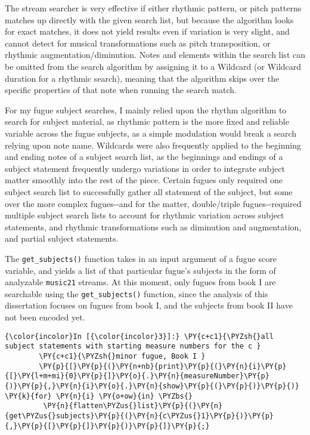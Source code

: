 The stream searcher is very effective if either rhythmic pattern, or
pitch patterns matches up directly with the given search list, but
because the algorithm looks for exact matches, it does not yield results
even if variation is very slight, and cannot detect for musical
transformations such as pitch transposition, or rhythmic
augmentation/diminution. Notes and elements within the search list can
be omitted from the search algorithm by assigning it to a Wildcard (or
Wildcard duration for a rhythmic search), meaning that the algorithm
skips over the specific properties of that note when running the search
match.

For my fugue subject searches, I mainly relied upon the rhythm algorithm
to search for subject material, as rhythmic pattern is the more fixed
and reliable variable across the fugue subjects, as a simple modulation
would break a search relying upon note name. Wildcards were also
frequently applied to the beginning and ending notes of a subject search
list, as the beginnings and endings of a subject statement frequently
undergo variations in order to integrate subject matter smoothly into
the rest of the piece. Certain fugues only required one subject search
list to successfully gather all statement of the subject, but some over
the more complex fugues-\/-and for the matter, double/triple
fugues-\/-required multiple subject search lists to account for rhythmic
variation across subject statements, and rhythmic transformations such
as diminution and augmentation, and partial subject statements.

The \texttt{get\_subjects()} function takes in an input argument of a
fugue score variable, and yields a list of that particular fugue's
subjects in the form of analyzable \texttt{music21} streams. At this
moment, only fugues from book I are searchable using the
\texttt{get\_subjects()} function, since the analysis of this
dissertation focuses on fugues from book I, and the subjects from book
II have not been encoded yet.

    \begin{Verbatim}[commandchars=\\\{\}]
{\color{incolor}In [{\color{incolor}3}]:} \PY{c+c1}{\PYZsh{}all subject statements with starting measure numbers for the c }
        \PY{c+c1}{\PYZsh{}minor fugue, Book I }
        \PY{p}{[}\PY{p}{(}\PY{n+nb}{print}\PY{p}{(}\PY{n}{i}\PY{p}{[}\PY{l+m+mi}{0}\PY{p}{]}\PY{o}{.}\PY{n}{measureNumber}\PY{p}{)}\PY{p}{,}\PY{n}{i}\PY{o}{.}\PY{n}{show}\PY{p}{(}\PY{p}{)}\PY{p}{)} \PY{k}{for} \PY{n}{i} \PY{o+ow}{in} \PYZbs{}
         \PY{n}{flatten\PYZus{}list}\PY{p}{(}\PY{n}{get\PYZus{}subjects}\PY{p}{(}\PY{n}{c\PYZus{}1}\PY{p}{)}\PY{p}{,}\PY{p}{[}\PY{p}{]}\PY{p}{)}\PY{p}{]}\PY{p}{;}
\end{Verbatim}

